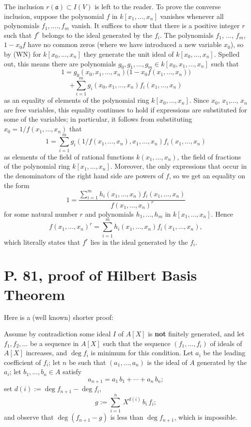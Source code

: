 \documentclass[12pt]{article}
\newcommand{\mf}{\mathfrak}
\begin{document}
The inclusion $r(\mf a)\subset I(V)$ is left to the reader. To prove the converse inclusion, suppose the polynomial $f$ in $k[x_1,...,x_n]$ vanishes whenever all polynomials $f_1,....,f_m$ vanish. It suffices to show that there is a positive integer $r$ such that $f^r$ belongs to the ideal generated by the $f_i$. The polynomials $f_1$, ..., $f_m$, $1-x_0f$ have no common zeros (where we have introduced a new variable $x_0$), so by (WN) for $k[x_0,...,x_n]$ they generate the unit ideal of $k[x_0,...,x_n]$. Spelled out, this means there are polynomials $g_0,g_1,\dots,g_m \in k[x_0,x_1,\dots,x_n]$ such that
$$
1 = g_0(x_0,x_1,\dots,x_n)\Big(1-x_0f(x_1,\dots,x_n)\Big)
$$
$$
+\sum_{i=1}^m g_i(x_0,x_1,\dots,x_n) f_i(x_1,\dots,x_n)
$$
as an equality of elements of the polynomial ring $k[x_0,\dots,x_n]$. Since $x_0$, $x_1$,..., $x_n$ are free variables, this equality continues to hold if expressions are substituted for some of the variables; in particular, it follows from substituting $x_0= 1/f(x_1,\dots,x_n)$ that
$$1=\sum_{i=1}^m g_i(1/f(x_1,\dots,x_n),x_1,\dots,x_n) f_i(x_1,\dots,x_n)$$
as elements of the field of rational functions $k(x_1,\dots,x_n)$, the field of fractions of the polynomial ring $k[x_1,\dots,x_n]$. Moreover, the only expressions that occur in the denominators of the right hand side are powers of $f$, so we get an equality on the form
$$1=\frac{\sum_{i=1}^mh_i(x_1,\dots,x_n)f_i(x_1,\dots,x_n)}{f(x_1,\dots,x_n)^r}$$
for some natural number $r$ and polynomials $h_1,\dots,h_m$ in $k[x_1,\dots,x_n]$. Hence
$$f(x_1,\dots,x_n)^r=\sum_{i=1}^mh_i(x_1,\dots,x_n)f_i(x_1,\dots,x_n),$$
which literally states that $f^r$ lies in the ideal generated by the $f_i$.\bigskip

\section{P. 81, proof of Hilbert Basis Theorem}%

Here is a (well known) shorter proof:

Assume by contradiction some ideal $I$ of $A[X]$ is \textbf{not} finitely generated, and let $f_1,f_2,\dots$ be a sequence in $A[X]$ such that the sequence $(f_1,\dots,f_i)$ of ideals of $A[X]$ increases, and $\deg f_i$ is minimum for this condition. Let $a_i$ be the leading coefficient of $f_i$; let $n$ be such that $(a_1,\dots,a_n)$ is the ideal of $A$ generated by the $a_i$; let $b_1,\dots,b_n\in A$ satisfy 
$$
a_{n+1}=a_1\,b_1+\cdots+a_n\,b_n;
$$ 
set $d(i):=\deg f_{n+1}-\deg f_i$, 
$$
g:=\sum_{i=1}^n\,X^{d(i)}\,b_i\,f_i;
$$ 
and observe that $\deg(f_{n+1}-g)$ is less than $\deg f_{n+1}$, which is impossible.
\end{document}
